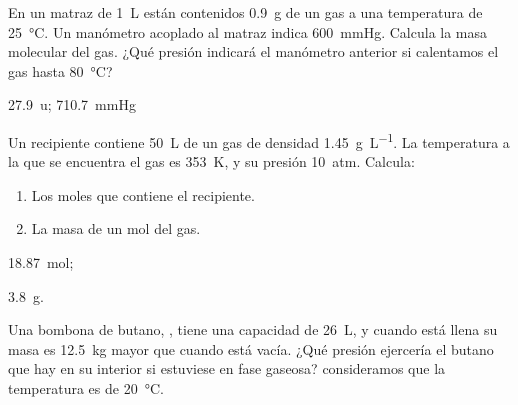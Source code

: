 \begin{exercise}[
    tags    = {termodinámica, entalpía, entalpia de reacción, calor},
    topics  = {química, termoquímica, termodinámica},
    source  = {FQ 1B OXF 2015, p61, e24-25},
  ]
  En un matraz de \SI{1}{\liter} están contenidos \SI{0.9}{\gram} de un gas a una temperatura de \SI{25}{\celsius}. Un manómetro acoplado al matraz indica \SI{600}{\mmHg}. Calcula la masa  molecular del gas. ¿Qué presión indicará el manómetro anterior si calentamos el gas hasta \SI{80}{\celsius}?
\end{exercise}

\begin{solution}
  \SI{27.9}{u}; \SI{710.7}{\mmHg}
\end{solution}



\begin{exercise}[
    tags    = {termodinámica, entalpía, entalpia de reacción, calor},
    topics  = {química, termoquímica, termodinámica},
    source  = {FQ 1B OXF 2015, p61, e29},
  ]
  Un recipiente contiene \SI{50}{\liter} de un gas de densidad \SI{1.45}{\gram\per\liter}. La temperatura a la que se encuentra el gas es \SI{353}{\kelvin}, y su presión \SI{10}{atm}. Calcula:
  \begin{enumerate}
    \item Los moles que contiene el recipiente.
    \item La masa de un mol del gas.
  \end{enumerate}
\end{exercise}

\begin{solution}
  \begin{enumerate*}
    \item \SI{18.87}{\mole};
    \item \SI{3.8}{\gram}.
  \end{enumerate*}
\end{solution}




\begin{exercise}[
    tags    = {termodinámica, entalpía, entalpia de reacción, calor},
    topics  = {química, termoquímica, termodinámica},
    source  = {FQ 1B SAN 2015, p67, e49},
  ]
  Una bombona de butano, , tiene una capacidad de \SI{26}{\liter}, y cuando está llena su masa es \SI{12.5}{\kilo\gram} mayor que cuando está vacía. ¿Qué presión ejercería el butano que hay en su interior si estuviese en fase gaseosa? consideramos que la temperatura es de \SI{20}{\celsius}.
\end{exercise}

